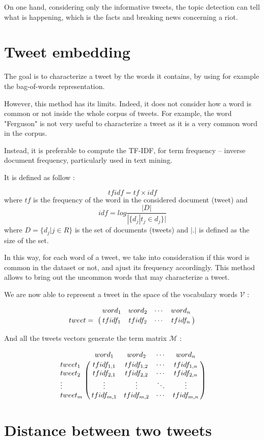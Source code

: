 \documentclass[a4paper,12pt]{report}
\begin{document}
On one hand, considering only the informative tweets, the topic detection can tell what is happening, which is the facts and breaking news concerning a riot.
\newpage

\section{Tweet embedding}

The goal is to characterize a tweet by the words it contains, by using for example the bag-of-words representation.

However, this method has its limits. Indeed, it does not consider how a word is common or not inside the whole corpus of tweets. For example, the word "Ferguson" is not very useful to characterize a tweet as it is a very common word in the corpus.

Instead, it is preferable to compute the TF-IDF, for term frequency – inverse document frequency, particularly used in text mining.

It is defined as follow : 

$$tfidf = tf \times idf$$ 
where 
$tf$ is the frequency of the word in the considered document (tweet) and
$$idf = log \frac{|D|}{|\{d_j | t_j \in d_j\}|}$$
where $D = \{d_j | j\in R\} $ is the set of documents (tweets) and $|.|$ is defined as the size of the set.

In this way, for each word of a tweet, we take into consideration if this word is common in the dataset or not, and ajust its frequency accordingly. This method allows to bring out the uncommon words that may characterize a tweet.

We are now able to represent a tweet in the space of the vocabulary words $\mathcal{V}$ :

\[
\bordermatrix{~ & word_1 & word_2 & \cdots & word_n \cr tweet =  & tfidf_1 & tfidf_2 & \cdots & tfidf_n \cr}
\]

And all the tweets vectors generate the term matrix $\mathcal{M}$ :

\[
\bordermatrix{
~ & word_1 & word_2 & \cdots & word_n \cr 
tweet_1 & tfidf_{1,1} & tfidf_{1,2} & \cdots & tfidf_{1,n} \cr
tweet_2 & tfidf_{2,1} & tfidf_{2,2} & \cdots & tfidf_{2,n} \cr
\vdots & \vdots & \vdots & \ddots & \vdots \cr
tweet_m & tfidf_{m,1} & tfidf_{m,2} & \cdots & tfidf_{m,n} \cr
}
\]

\newpage

\section{Distance between two tweets}
\end{document}

